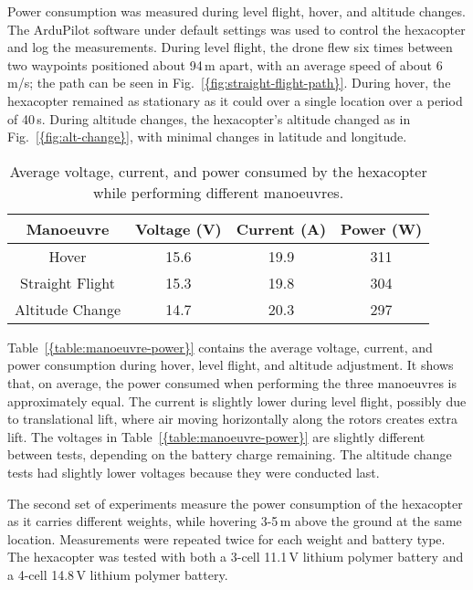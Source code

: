 \documentclass[journal]{IEEEtran}
\begin{document}
Power consumption was measured during level flight, hover, and altitude changes. The ArduPilot software under default settings was used to control the hexacopter and log the measurements. During level flight, the drone flew six times between two waypoints positioned about 94\,m apart, with an average speed of about 6\,m/s; the path can be seen in {Fig.~\ref{{fig:straight-flight-path}}}. During hover, the hexacopter remained as stationary as it could over a single location over a period of 40\,s. During altitude changes, the hexacopter's altitude changed as in {Fig.~\ref{{fig:alt-change}}}, with minimal changes in latitude and longitude.
\begin{table}[t!]
\caption{Average voltage, current, and power consumed by the hexacopter while performing different manoeuvres.}
\label{table:manoeuvre-power}
\footnotesize                                      
\centering                                                              
\begin{tabular}{|c|c c c|}                                        
\hline
Manoeuvre & Voltage (V) & Current (A) & Power (W) \\
\hline
Hover & 15.6 & 19.9 & 311  \\
Straight Flight & 15.3 & 19.8 & 304 \\
Altitude Change & 14.7 & 20.3 & 297 \\
\hline
\end{tabular}                                                                                                        
\end{table}

{Table~\ref{{table:manoeuvre-power}}} contains the average voltage, current, and power consumption during hover, level flight, and altitude adjustment. It shows that, on average, the power consumed when performing the three manoeuvres is approximately equal. The current is slightly lower during level flight, possibly due to translational lift, where air moving horizontally along the rotors creates extra lift. The voltages in {Table~\ref{{table:manoeuvre-power}}} are slightly different between tests, depending on the battery charge remaining. The altitude change tests had slightly lower voltages because they were conducted last.

The second set of experiments measure the power consumption of the hexacopter as it carries different weights, while hovering 3-5\,m above the ground at the same location. Measurements were repeated twice for each weight and battery type. The hexacopter was tested with both a 3-cell 11.1\,V lithium polymer battery and a 4-cell 14.8\,V lithium polymer battery.
\end{document}
